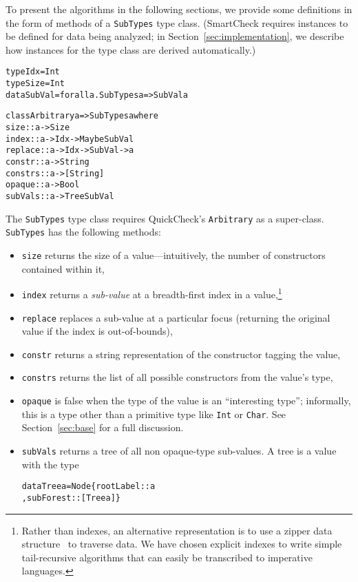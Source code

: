 \documentclass{sigplanconf}
\newenvironment{code}{\begin{alltt}\footnotesize}{\end{alltt}}
\newcommand{\ttp}[1]{\texttt{#1}}
\begin{document}
To present the algorithms in the following sections, we provide some definitions
in the form of methods of a \ttp{SubTypes} type class.  (SmartCheck requires
instances to be defined for data being analyzed; in
Section~\ref{sec:implementation}, we describe how instances for the type class
are derived automatically.)
%
\begin{code}
type Idx    = Int
type Size   = Int
data SubVal = forall a. SubTypes a => SubVal a

class Arbitrary a => SubTypes a where
  size    :: a -> Size
  index   :: a -> Idx -> Maybe SubVal
  replace :: a -> Idx -> SubVal -> a
  constr  :: a -> String
  constrs :: a -> [String]
  opaque  :: a -> Bool
  subVals :: a -> Tree SubVal
\end{code}
%
\noindent
The \ttp{SubTypes} type class requires QuickCheck's \ttp{Arbitrary} as a
super-class.  \ttp{SubTypes} has the following methods:
\begin{itemize}
\item \ttp{size} returns the size of a value---intuitively, the number of
  constructors contained within it,
\item \ttp{index} returns a \emph{sub-value} at a breadth-first index in a
  value,\footnote{Rather than indexes, an alternative representation is to use a
    zipper data structure~\cite{zipper} to traverse data.  We have chosen
    explicit indexes to write simple tail-recursive algorithms that can easily
    be transcribed to imperative languages.}
\item \ttp{replace} replaces a sub-value at a particular focus (returning the
  original value if the index is out-of-bounds),
\item \ttp{constr} returns a string representation of the constructor tagging
  the value,
\item \ttp{constrs} returns the list of all possible constructors from the
  value's type,
\item \ttp{opaque} is false when the type of the value is an ``interesting
  type''; informally, this is a type other than a primitive type like \ttp{Int}
  or \ttp{Char}.  See Section~\ref{sec:base} for a full discussion.
\item \ttp{subVals} returns a tree of all non opaque-type sub-values.  A tree is a
  value with the type
%
  \begin{code}
data Tree a = Node \{ rootLabel :: a
                   , subForest :: [Tree a] \}
  \end{code}
%
\end{itemize}
\end{document}
